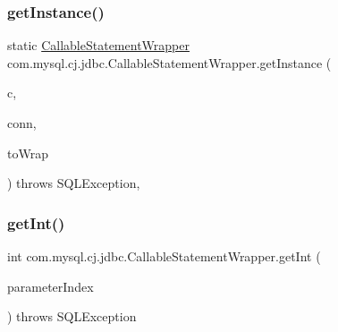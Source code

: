 \subsubsection{\texorpdfstring{get\+Instance()}{getInstance()}}
{\footnotesize\ttfamily static \mbox{\hyperlink{classcom_1_1mysql_1_1cj_1_1jdbc_1_1_callable_statement_wrapper}{Callable\+Statement\+Wrapper}} com.\+mysql.\+cj.\+jdbc.\+Callable\+Statement\+Wrapper.\+get\+Instance (\begin{DoxyParamCaption}\item[{\mbox{\hyperlink{classcom_1_1mysql_1_1cj_1_1jdbc_1_1_connection_wrapper}{Connection\+Wrapper}}}]{c,  }\item[{\mbox{\hyperlink{classcom_1_1mysql_1_1cj_1_1jdbc_1_1_mysql_pooled_connection}{Mysql\+Pooled\+Connection}}}]{conn,  }\item[{\mbox{\hyperlink{classcom_1_1mysql_1_1cj_1_1jdbc_1_1_callable_statement}{Callable\+Statement}}}]{to\+Wrap }\end{DoxyParamCaption}) throws S\+Q\+L\+Exception\hspace{0.3cm}{\ttfamily [static]}, {\ttfamily [protected]}}

\mbox{\label{classcom_1_1mysql_1_1cj_1_1jdbc_1_1_callable_statement_wrapper_a3751d784b7710faee7534a932450d64e}} 
\subsubsection{\texorpdfstring{get\+Int()}{getInt()}\hspace{0.1cm}{\footnotesize\ttfamily [1/2]}}
{\footnotesize\ttfamily int com.\+mysql.\+cj.\+jdbc.\+Callable\+Statement\+Wrapper.\+get\+Int (\begin{DoxyParamCaption}\item[{int}]{parameter\+Index }\end{DoxyParamCaption}) throws S\+Q\+L\+Exception}

\mbox{\label{classcom_1_1mysql_1_1cj_1_1jdbc_1_1_callable_statement_wrapper_a9e8fdf85022e6262dbbccd281f60078c}} 

